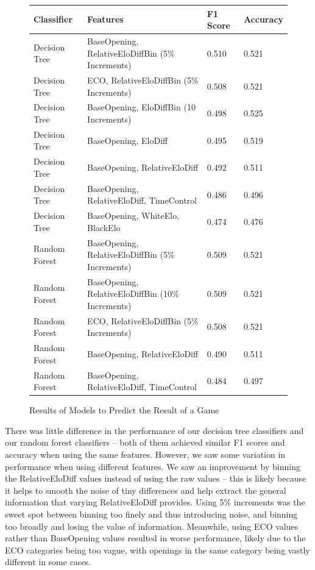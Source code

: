\documentclass[a4paper, 11pt]{article}
\begin{document}
\begin{figure}[H]
    \centering
    \caption{Results of Models to Predict the Result of a Game}
    \label{fig:resultsOfModelsToPredictResultOfAGame}
    \begin{tabular}{| l | l | l | l |} 
        \hline
        \bf{Classifier} & \bf{Features} & \bf{F1 Score} & \bf{Accuracy} \\ [0.5ex] 
        \hline
        Decision Tree & BaseOpening, RelativeEloDiffBin (5\% Increments) & 0.510 & 0.521 \\
        \hline
        Decision Tree & ECO, RelativeEloDiffBin (5\% Increments) & 0.508 & 0.521 \\
        \hline
        Decision Tree & BaseOpening, EloDiffBin (10 Increments) & 0.498 & 0.525 \\
        \hline
        Decision Tree & BaseOpening, EloDiff & 0.495 & 0.519 \\
        \hline
        Decision Tree & BaseOpening, RelativeEloDiff & 0.492 & 0.511 \\
        \hline
        Decision Tree & BaseOpening, RelativeEloDiff, TimeControl & 0.486 & 0.496 \\
        \hline
        Decision Tree & BaseOpening, WhiteElo, BlackElo & 0.474 & 0.476 \\ 
        \hline
        Random Forest & BaseOpening, RelativeEloDiffBin (5\% Increments) & 0.509 & 0.521 \\ 
        \hline
        Random Forest & BaseOpening, RelativeEloDiffBin (10\% Increments) & 0.509 & 0.521 \\ 
        \hline
        Random Forest & ECO, RelativeEloDiffBin (5\% Increments) & 0.508 & 0.521 \\ 
        \hline
        Random Forest & BaseOpening, RelativeEloDiff & 0.490 & 0.511 \\ 
        \hline
        Random Forest & BaseOpening, RelativeEloDiff, TimeControl & 0.484 & 0.497 \\ 
        \hline
    \end{tabular}
\end{figure}

There was little difference in the performance of our decision tree classifiers and our random forest classifiers -- both of them achieved similar F1 scores and accuracy when using the same features. However, we saw some variation in performance when using different features. We saw an improvement by binning the RelativeEloDiff values instead of using the raw values -- this is likely because it helps to smooth the noise of tiny differences and help extract the general information that varying RelativeEloDiff provides. Using 5\% increments was the sweet spot between binning too finely and thus introducing noise, and binning too broadly and losing the value of information. Meanwhile, using ECO values rather than BaseOpening values resulted in worse performance, likely due to the ECO categories being too vague, with openings in the same category being vastly different in some cases.
\end{document}
